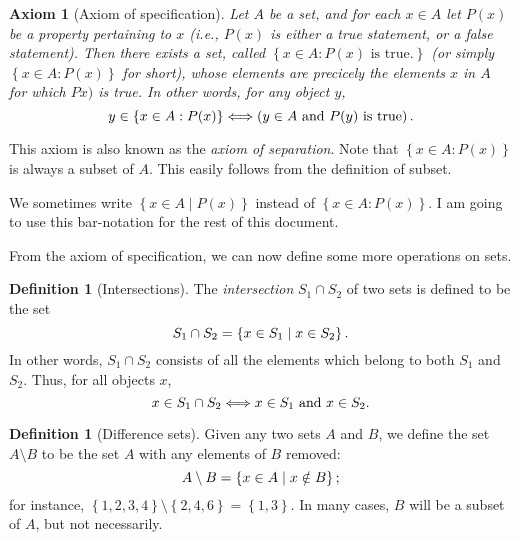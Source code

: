 \documentclass[a4paper, twocolumn]{report}
\newcounter{dummy} \numberwithin{dummy}{section}
\newcounter{axmcntr} \numberwithin{axmcntr}{chapter}
\newtheorem{axm}[axmcntr]{Axiom}
\theoremstyle{definition}
\newtheorem{defn}[dummy]{Definition}
\theoremstyle{solution}
\newcommand{\intrsct}{\cap}
\begin{document}
\begin{axm}[Axiom of specification]
  \label{axm_35}
  Let $A$ be a set, and for each $x \in A$ let $P(x)$ be a property pertaining
  to $x$ (i.e., $P(x)$ is either a true statement, or a false statement). Then
  there exists a set, called $\left\{ x \in A : P(x) \text{ is true.} \right\}$
  (or simply $\left\{x \in A : P(x)\right\}$ for short), whose elements are
precicely the elements $x$ in $A$ for which $Px)$ is true. In other words,
for any object $y$,
\begin{equation}
  \notag
  y \in \left\{ x \in A : P(x) \right\} \Longleftrightarrow \left( y \in A \text{ and } P(y) \text{ is true}\right).
\end{equation}
\end{axm}

This axiom is also known as the \textit{axiom of separation}. Note that
$\left\{ x \in A : P(x) \right\}$ is always a subset of $A$. This easily
follows from the definition of subset. 

We sometimes write $\left\{ x \in A \mid P(x) \right\}$ instead of $\left\{ x
\in A : P(x) \right\}$. I am going to use this bar-notation for the rest of this
document.
\addtocounter{dummy}{1}

From the axiom of specification, we can now define some more operations on sets.

\begin{defn}[Intersections]
  \label{defn_3123} 
  The \textit{intersection} $S_1 \intrsct S_2$ of two sets is defined to be the set
  \begin{equation}
    \notag
    S_1 \intrsct S_2 = \left\{ x \in S_1 \mid x \in S_2 \right\}.
  \end{equation}
  In other words, $S_1 \intrsct S_2$ consists of all the elements which belong to both $S_1$ and $S_2$. Thus, for all objects $x$,
  \begin{equation}
    \notag
    x \in S_1 \intrsct S_2 \Longleftrightarrow x \in S_1 \text { and } x \in S_2.
  \end{equation}
\end{defn}

\addtocounter{dummy}{3}

\begin{defn}[Difference sets]
  \label{defn_3127}
  Given any two sets $A$ and $B$, we define the set $A \setminus B$ to be the set $A$
  with any elements of $B$ removed:
  \begin{equation}
    \notag
    A \setminus B = \left\{ x \in A \mid x \notin B \right\};
  \end{equation}
  for instance, $\left\{ 1, 2, 3, 4 \right\} \setminus \left\{ 2, 4, 6 \right\} =
  \left\{ 1, 3 \right\}$. In many cases, $B$ will be a subset of $A$, but not
  necessarily.
\end{defn}
\end{document}
